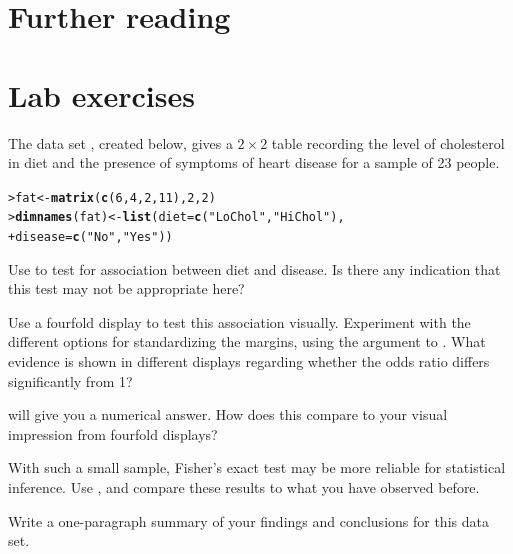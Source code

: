 \documentclass[10pt,krantz2]{krantz}\usepackage[]{graphicx}\usepackage[]{color}
\makeatletter
\newcommand{\hlnum}[1]{\textcolor[rgb]{0.686,0.059,0.569}{#1}}%
\newcommand{\hlstr}[1]{\textcolor[rgb]{0.192,0.494,0.8}{#1}}%
\newcommand{\hlstd}[1]{\textcolor[rgb]{0.345,0.345,0.345}{#1}}%
\newcommand{\hlkwb}[1]{\textcolor[rgb]{0.69,0.353,0.396}{#1}}%
\newcommand{\hlkwc}[1]{\textcolor[rgb]{0.333,0.667,0.333}{#1}}%
\newcommand{\hlkwd}[1]{\textcolor[rgb]{0.737,0.353,0.396}{\textbf{#1}}}%
\newenvironment{kframe}{%
 \def\at@end@of@kframe{}%
 \ifinner\ifhmode%
  \def\at@end@of@kframe{\end{minipage}}%
  \begin{minipage}{\columnwidth}%
 \fi\fi%
 \def\FrameCommand##1{\hskip\@totalleftmargin \hskip-\fboxsep
 \colorbox{shadecolor}{##1}\hskip-\fboxsep
     \hskip-\linewidth \hskip-\@totalleftmargin \hskip\columnwidth}%
 \MakeFramed {\advance\hsize-\width
   \@totalleftmargin\z@ \linewidth\hsize
   \@setminipage}}%
 {\par\unskip\endMakeFramed%
 \at@end@of@kframe}
\newenvironment{knitrout}{}{} %
\renewenvironment{knitrout}{\small\renewcommand{\baselinestretch}{.85}}{} %
\makeatother
\begin{document}
\section{Further reading}\label{sec:twoway-reading}

\section{Lab exercises}\label{sec:twoway-lab}


\begin{Exercises}

  \exercise The data set , created below, gives a $2 \times 2$ table recording the level of
  cholesterol in diet and the presence of symptoms of heart disease for a sample of
  23 people.

\begin{knitrout}
\color{fgcolor}\begin{kframe}
\begin{alltt}
\hlstd{> }\hlstd{fat} \hlkwb{<-} \hlkwd{matrix}\hlstd{(}\hlkwd{c}\hlstd{(}\hlnum{6}\hlstd{,} \hlnum{4}\hlstd{,} \hlnum{2}\hlstd{,} \hlnum{11}\hlstd{),} \hlnum{2}\hlstd{,} \hlnum{2}\hlstd{)}
\hlstd{> }\hlkwd{dimnames}\hlstd{(fat)} \hlkwb{<-} \hlkwd{list}\hlstd{(}\hlkwc{diet} \hlstd{=} \hlkwd{c}\hlstd{(}\hlstr{"LoChol"}\hlstd{,} \hlstr{"HiChol"}\hlstd{),}
\hlstd{+ }                      \hlkwc{disease} \hlstd{=} \hlkwd{c}\hlstd{(}\hlstr{"No"}\hlstd{,} \hlstr{"Yes"}\hlstd{))}
\end{alltt}
\end{kframe}
\end{knitrout}

  \begin{enumerate*}
    \item Use  to test for association between diet and disease.
    Is there any indication that this test may not be appropriate here?
    \item Use a fourfold display to test this association visually.  Experiment with
    the different options for standardizing the margins, using the 
    argument to . What evidence is shown in different displays regarding
    whether the odds ratio differs significantly from 1?
    \item {} will give you a numerical answer.  How does
    this compare to your visual impression from fourfold displays?
    \item With such a small sample, Fisher's exact test may be more reliable for statistical
    inference.  Use , and compare these results to what you have
    observed before.
    \item Write a one-paragraph summary of your findings and conclusions for this data set.
  \end{enumerate*}


\end{Exercises}
\end{document}
